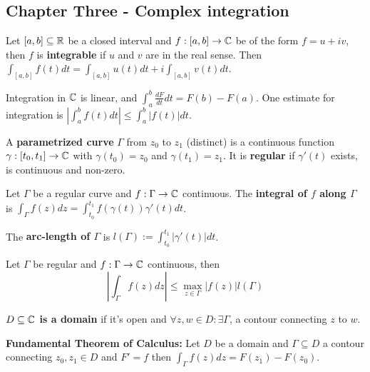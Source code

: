 \noindent
\begin{multicols}{2}
\section*{Chapter Three - Complex integration}

\begin{definition}
Let $[a,b]\subseteq\mathbb{R}$ be a closed interval and $f:[a,b]\to\mathbb{C}$ be of the form $f=u+iv$, then $f$ is \textbf{integrable} if $u$ and $v$ are in the real sense. Then $\int_{[a,b]}f(t)dt = \int_{[a,b]}u(t)dt + i\int_{[a,b]}v(t)dt$.
\end{definition}

\begin{theorem}[3.1.2]
Integration in $\mathbb{C}$ is linear, and $\int_a^b\frac{dF}{dt}dt = F(b)-F(a)$. One estimate for integration is $\left|\int_a^bf(t)dt\right|\leq \int_a^b|f(t)|dt$.
\end{theorem}

\begin{definition}
A \textbf{parametrized curve} $\Gamma$ from $z_0$ to $z_1$ (distinct) is a continuous function $\gamma:[t_0,t_1]\to\mathbb{C}$ with $\gamma(t_0)=z_0$ and $\gamma(t_1)=z_1$. It is \textbf{regular} if $\gamma'(t)$ exists, is continuous and non-zero.
\end{definition}

\begin{definition}
Let $\Gamma$ be a regular curve and $f:\Gamma\to\mathbb{C}$ continuous. The \textbf{integral of $f$ along $\Gamma$} is $\int_\Gamma f(z)dz = \int_{t_0}^{t_1} f(\gamma(t))\gamma'(t)dt$.
\end{definition}

\begin{definition}
The \textbf{arc-length of $\Gamma$} is $l(\Gamma):=\int_{t_0}^{t_1}|\gamma'(t)|dt$.
\end{definition}

\begin{theorem}[3.2.9]
Let $\Gamma$ be regular and $f:\Gamma\to\mathbb{C}$ continuous, then
    \[
    \left|\int_\Gamma f(z) dz\right| \leq \max_{z\in\Gamma}|f(z)|l(\Gamma)
    \]
\end{theorem}

\begin{definition}
\textbf{$D\subseteq\mathbb{C}$ is a domain} if it's open and $\forall z,w\in D: \exists\Gamma$, a contour connecting $z$ to $w$.
\end{definition}

\begin{theorem}
\textbf{Fundamental Theorem of Calculus:} Let $D$ be a domain and $\Gamma\subseteq D$ a contour connecting $z_0,z_1\in D$ and $F'=f$ then $\int_\Gamma f(z)dz = F(z_1)-F(z_0)$.
\end{theorem}


\end{multicols}
